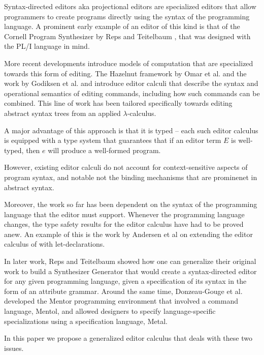\documentclass[sigplan,anonymous,review]{acmart}
\begin{document}
Syntax-directed editors aka projectional editors are specialized
editors that allow programmers to create programs directly using the
syntax of the programming language. A prominent early example of an
editor of this kind is that of the Cornell Program Synthesizer by Reps and
Teitelbaum \cite{10.1145/358746.358755}, that was designed with the
PL/I language in mind.

More recent developments introduce models of computation that are
specialized towards this form of editing. The Hazelnut framework by
Omar et al. \cite{hazelnut} and the work by Godiksen et al. and
\cite{type_safe_structure_editor} introduce editor calculi that
describe the syntax and operational semantics of editing commands,
including how such commands can be combined. This line of work has
been tailored specifically towards editing abstract syntax trees from
an applied $\lambda$-calculus.

A major advantage of this approach is that it is typed -- each such editor calculus
is equipped with a type system that guarantees that if an editor term
$E$ is well-typed, then $e$ will produce a well-formed program.

However, existing editor calculi do not account for context-sensitive
aspects of program syntax, and notable not the binding 
mechanisms that are prominenet in abstract syntax.

Moreover, the work so far has been dependent on the syntax of the
programming language that the editor must support. Whenever the
programming language changes, the type safety results for the editor
calculus have had to be proved anew. An example of this is the work by
Andersen et al \cite{10.1145/3587216.3587221} on extending the editor
calculus of \cite{type_safe_structure_editor} with let-declarations.

In later work, Reps and Teitelbaum showed \cite{10.1145/390011.808247}
how one can generalize their original work to build a Synthesizer
Generator that would create a syntax-directed editor for any given
programming language, given a specification of its syntax in the form
of an attribute grammar. Around the same time, Donzeau-Gouge et
al. developed the Mentor programming environment
\cite{10.5555/800054.801990} that involved a command language, Mentol,
and allowed designers to specify language-specific specializations
using a specification language, Metal.

In this paper we propose a generalized editor calculus that deals with
these two issues.
\end{document}
